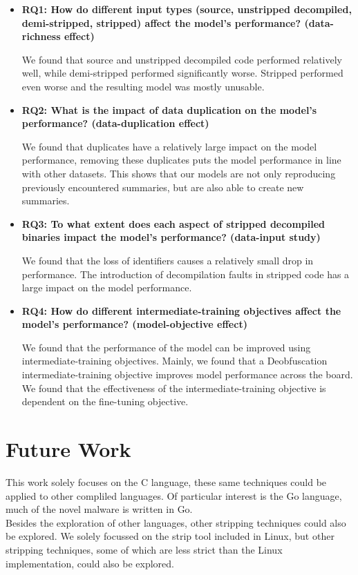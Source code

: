 \begin{itemize}
    \item \textbf{RQ1: How do different input types (source, unstripped decompiled, demi-stripped, stripped) affect the model's performance? (data-richness effect)}
    \begin{sloppypar}
    We found that source and unstripped decompiled code performed relatively well, while demi-stripped performed significantly worse. Stripped performed even worse and the resulting model was mostly unusable.
    \end{sloppypar}
    \item \textbf{RQ2: What is the impact of data duplication on the model's performance? (data-duplication effect)}
    \begin{sloppypar}
    We found that duplicates have a relatively large impact on the model performance, removing these duplicates puts the model performance in line with other datasets. This shows that our models are not only reproducing previously encountered summaries, but are also able to create new summaries.
    \end{sloppypar}
    \item \textbf{RQ3: To what extent does each aspect of stripped decompiled binaries impact the model's performance? (data-input study)}
    \begin{sloppypar}
    We found that the loss of identifiers causes a relatively small drop in performance. The introduction of decompilation faults in stripped code has a large impact on the model performance.
    \end{sloppypar}
    \item \textbf{RQ4: How do different intermediate-training objectives affect the model's performance? (model-objective effect)}
    \begin{sloppypar}
    We found that the performance of the model can be improved using intermediate-training objectives. Mainly, we found that a Deobfuscation intermediate-training objective improves model performance across the board. We found that the effectiveness of the intermediate-training objective is dependent on the fine-tuning objective.
    \end{sloppypar}
\end{itemize}

\section{Future Work}
This work solely focuses on the C language, these same techniques could be applied to other compliled languages. Of particular interest is the Go language, much of the novel malware is written in Go.\\
Besides the exploration of other languages, other stripping techniques could also be explored. We solely focussed on the strip tool included in Linux, but other stripping techniques, some of which are less strict than the Linux implementation, could also be explored.\\

